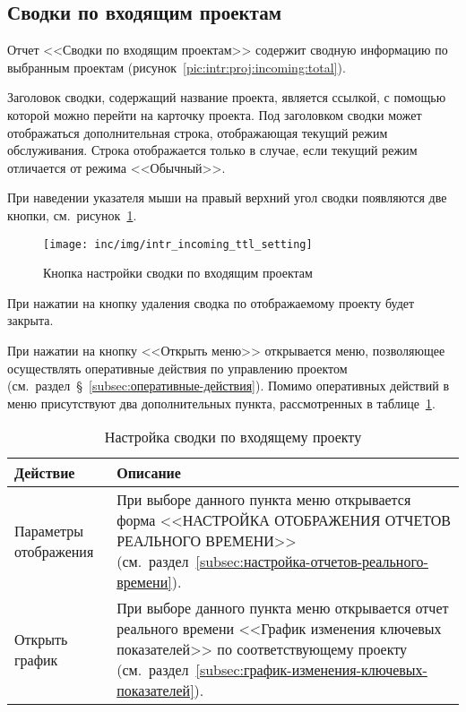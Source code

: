 \subsection{Сводки по входящим проектам}

Отчет <<Сводки по входящим проектам>> содержит сводную информацию по выбранным проектам (рисунок~\ref{pic:intr:proj:incoming:total}).

Заголовок сводки, содержащий название проекта, является ссылкой, с помощью которой можно перейти на карточку проекта.
Под заголовком сводки может отображаться дополнительная строка, отображающая текущий режим обслуживания.
Строка отображается только в случае, если текущий режим отличается от режима <<Обычный>>.

При наведении указателя мыши на правый верхний угол сводки появляются две кнопки, см.~рисунок~\ref{pic:intr:proj:incoming:total:setting}.

\begin{figure}[!ht]
    \centering
    \texttt{[image: inc/img/intr\_incoming\_ttl\_setting]}
    \caption{Кнопка настройки сводки по входящим проектам}
    \label{pic:intr:proj:incoming:total:setting}
\end{figure}

При нажатии на кнопку удаления сводка по отображаемому проекту будет закрыта.

При нажатии на кнопку <<Открыть меню>> открывается меню, позволяющее осуществлять оперативные действия по управлению проектом (см.~раздел~\S~\ref{subsec:оперативные-действия}).
Помимо оперативных действий в меню присутствуют два дополнительных пункта, рассмотренных в таблице~\ref{tab:prj:incoming:ttl:setting}.

\begin{table}[ht]
    \caption{Настройка сводки по входящему проекту}
    \begin{small}
        \begin{tabular}{|p{}|p{}|}
            \hline
            Действие & Описание \\
            \hline
            Параметры отображения & При выборе данного пункта меню открывается форма <<НАСТРОЙКА ОТОБРАЖЕНИЯ ОТЧЕТОВ РЕАЛЬНОГО ВРЕМЕНИ>> (см.~раздел~\ref{subsec:настройка-отчетов-реального-времени}).\\
            \hline
            Открыть график & При выборе данного пункта меню открывается отчет реального времени <<График изменения ключевых показателей>> по соответствующему проекту (см.~раздел~\ref{subsec:график-изменения-ключевых-показателей}).\\
            \hline
        \end{tabular}
    \end{small}
    \label{tab:prj:incoming:ttl:setting}
\end{table}

